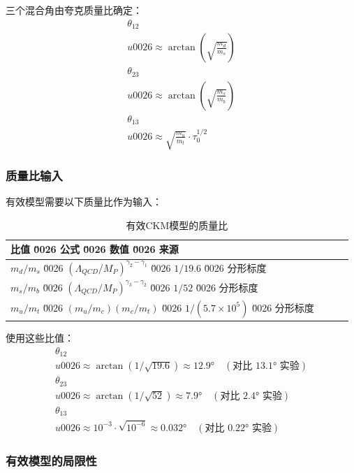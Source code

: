 三个混合角由夸克质量比确定：
\begin{align}
    \theta_{12} \\u0026\approx \arctan\left(\sqrt{\frac{m_d}{m_s}}\right) \\
    \theta_{23} \\u0026\approx \arctan\left(\sqrt{\frac{m_s}{m_b}}\right) \\
    \theta_{13} \\u0026\approx \sqrt{\frac{m_u}{m_t}} \cdot \tau_0^{1/2}
\end{align}

\subsubsection{质量比输入}

有效模型需要以下质量比作为输入：

\begin{table}[h]
\centering
\begin{tabular}{lccc}
\toprule
\textbf{比值} \u0026 \textbf{公式} \u0026 \textbf{数值} \u0026 \textbf{来源} \\
\midrule
$m_d/m_s$ \u0026 $(\Lambda_{QCD}/M_P)^{\gamma_2-\gamma_1}$ \u0026 $1/19.6$ \u0026 分形标度 \\
$m_s/m_b$ \u0026 $(\Lambda_{QCD}/M_P)^{\gamma_3-\gamma_2}$ \u0026 $1/52$ \u0026 分形标度 \\
$m_u/m_t$ \u0026 $(m_u/m_c)(m_c/m_t)$ \u0026 $1/(5.7\times 10^5)$ \u0026 分形标度 \\
\bottomrule
\end{tabular}
\caption{有效CKM模型的质量比}
\end{table}

使用这些比值：
\begin{align}
    \theta_{12} \\u0026\approx \arctan(1/\sqrt{19.6}) \approx 12.9° \quad (\text{对比 } 13.1° \text{ 实验}) \\
    \theta_{23} \\u0026\approx \arctan(1/\sqrt{52}) \approx 7.9° \quad (\text{对比 } 2.4° \text{ 实验}) \\
    \theta_{13} \\u0026\approx 10^{-3} \cdot \sqrt{10^{-6}} \approx 0.032° \quad (\text{对比 } 0.22° \text{ 实验})
\end{align}

\subsubsection{有效模型的局限性}

